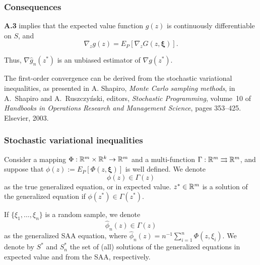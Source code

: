 \documentclass{beamer}
\def\bxi{\boldsymbol\xi}
\begin{document}
\begin{frame}
\frametitle{Consequences}

\textbf{A.3} implies that the expected value function $g(z)$ is continuously differentiable on $S$, and
\[
\nabla_z g(z) = E_P\left[ \nabla_z G(z, \bxi) \right].
\]

\mbox{}

Thus, $\nabla \hat{g}_n(z^*)$ is an unbiased estimator of $\nabla g( z^*)$.

\mbox{}

The {\blue first-order convergence} can be derived from the stochastic variational inequalities, as presented in A. Shapiro, {\sl Monte Carlo sampling methods},
in A.~Shapiro and A.~Ruszczy\'nski, editors, {\sl Stochastic Programming}, volume~10 of {\sl Handbooks in Operations Research and Management Science}, pages 353--425. Elsevier, 2003.

\end{frame}

\begin{frame}
\frametitle{Stochastic variational inequalities}

Consider a mapping $\Phi: \mathbb{R}^m \times \mathbb{R}^k \rightarrow \mathbb{R}^m$ and a multi-function $\Gamma: \mathbb{R}^m \rightrightarrows  \mathbb{R}^m$, and suppose that $\phi(z) := E_{P}[\Phi(z, \bxi)]$ is well defined.
We denote
\[
\phi(z) \in \Gamma(z)
\]
as the true {\blue generalized equation}, or in expected value.
$z^* \in \mathbb{R}^m$ is a solution of the generalized equation if $\phi(z^*) \in \Gamma(z^*)$.

\mbox{}

If $\lbrace \xi_1,\ldots,\xi_n \rbrace$ is a random sample, we denote
\[
\hat{\phi}_n(z) \in \Gamma(z)
\]
as the generalized SAA equation, where $\hat{\phi}_n(z) = n^{-1}\sum_{i=1}^n \Phi(z,\xi_i)$.
We denote by $S^*$ and $S^*_n$ the set of (all) solutions of the generalized equations in expected value and from the SAA, respectively.

\end{frame}
\end{document}
